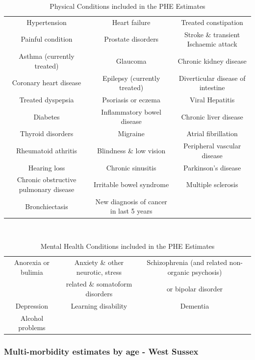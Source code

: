 \begin{table}
    \caption{Physical Conditions included in the PHE Estimates}
    \centering
    \begin{tabular}{ccc}
        \toprule
        Hypertension & Heart failure & Treated constipation\\
        Painful condition & Prostate disorders & Stroke \& transient Ischaemic attack\\
        Asthma (currently treated) & Glaucoma & Chronic kidney disease \\
        Coronary heart disease & Epilepsy (currently treated) & Diverticular disease of intestine \\
        Treated dyspepsia & Psoriasis or eczema & Viral Hepatitis \\
        Diabetes & Inflammatory bowel disease & Chronic liver disease \\
        Thyroid disorders & Migraine & Atrial fibrillation \\
        Rheumatoid athritis & Blindness \& low vision & Peripheral vascular disease \\ 
        Hearing loss & Chronic sinusitis & Parkinson's disease \\
        Chronic obstructive pulmonary disease & Irritable bowel syndrome & Multiple sclerosis \\
        Bronchiectasis & New diagnosis of cancer in last 5 years & \ \\
        \bottomrule
    \end{tabular}
    \label{tab:op:phys_conditions}
\end{table}
\begin{table}
    \caption{Mental Health Conditions included in the PHE Estimates}\
    \centering
    \begin{tabular}{ccc}
        \toprule
        Anorexia or bulimia & Anxiety \& other neurotic, stress & Schizophrenia (and related non-organic psychosis) \\
        \ & related \& somatoform disorders & or bipolar disorder \\
        Depression & Learning disability & Dementia \\
        Alcohol problems & \ & \ \\
        \bottomrule
    \end{tabular}
    \label{tab:op:mh_conditions}
\end{table}
  
\subsubsection{Multi-morbidity estimates by age - West Sussex}


